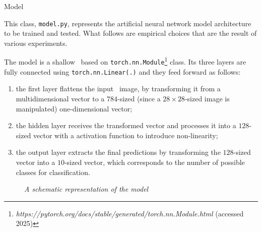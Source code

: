 \begin{section}{Model}
    \par This class, \texttt{model.py}, represents the artificial neural network model architecture to be trained and tested. What follows are empirical choices that are the result of various experiments.\\
    \par The model is a shallow~ based on \texttt{torch.nn.Module}\footnote{\textit{https://pytorch.org/docs/stable/generated/torch.nn.Module.html} (accessed 2025)} class. Its three layers are fully connected using \texttt{torch.nn.Linear(.)} and they feed forward as follows:
    \begin{enumerate}
        \item the first layer flattens the input~ image, by transforming it from a multidimensional vector to a $784$-sized (since a $28 \times 28$-sized image is manipulated) one-dimensional vector;
        \item the hidden layer receives the transformed vector and processes it into a $128$-sized vector with a  activation function to introduce non-linearity;
        \item the output layer extracts the final predictions by transforming the $128$-sized vector into a $10$-sized vector, which corresponds to the number of possible classes for classification.
    \end{enumerate}
    \vspace{1cm}
    \begin{figure}[h]
        \centering
        
        \caption[A schematic representation of the model.]{\emph{A schematic representation of the model}\footnotemark}
        \label{fig:model}
    \end{figure}

\end{section}
\clearpage